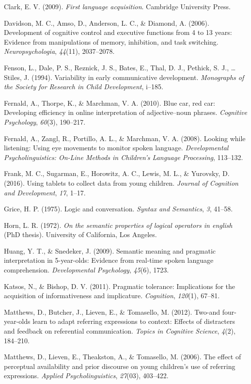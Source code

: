 \documentclass[a4paper,man,apacite,floatsintext]{apa6}
\begin{document}
Clark, E. V. (2009). \emph{First language acquisition}. Cambridge
University Press.

Davidson, M. C., Amso, D., Anderson, L. C., \& Diamond, A. (2006).
Development of cognitive control and executive functions from 4 to 13
years: Evidence from manipulations of memory, inhibition, and task
switching. \emph{Neuropsychologia}, \emph{44}(11), 2037--2078.

Fenson, L., Dale, P. S., Reznick, J. S., Bates, E., Thal, D. J.,
Pethick, S. J., \ldots{} Stiles, J. (1994). Variability in early
communicative development. \emph{Monographs of the Society for Research
in Child Development}, i--185.

Fernald, A., Thorpe, K., \& Marchman, V. A. (2010). Blue car, red car:
Developing efficiency in online interpretation of adjective--noun
phrases. \emph{Cognitive Psychology}, \emph{60}(3), 190--217.

Fernald, A., Zangl, R., Portillo, A. L., \& Marchman, V. A. (2008).
Looking while listening: Using eye movements to monitor spoken language.
\emph{Developmental Psycholinguistics: On-Line Methods in Children's
Language Processing}, 113--132.

Frank, M. C., Sugarman, E., Horowitz, A. C., Lewis, M. L., \& Yurovsky,
D. (2016). Using tablets to collect data from young children.
\emph{Journal of Cognition and Development}, \emph{17}, 1--17.

Grice, H. P. (1975). Logic and conversation. \emph{Syntax and
Semantics}, \emph{3}, 41--58.

Horn, L. R. (1972). \emph{On the semantic properties of logical
operators in english} (PhD thesis). University of California, Los
Angeles.

Huang, Y. T., \& Snedeker, J. (2009). Semantic meaning and pragmatic
interpretation in 5-year-olds: Evidence from real-time spoken language
comprehension. \emph{Developmental Psychology}, \emph{45}(6), 1723.

Katsos, N., \& Bishop, D. V. (2011). Pragmatic tolerance: Implications
for the acquisition of informativeness and implicature.
\emph{Cognition}, \emph{120}(1), 67--81.

Matthews, D., Butcher, J., Lieven, E., \& Tomasello, M. (2012). Two-and
four-year-olds learn to adapt referring expressions to context: Effects
of distracters and feedback on referential communication. \emph{Topics
in Cognitive Science}, \emph{4}(2), 184--210.

Matthews, D., Lieven, E., Theakston, A., \& Tomasello, M. (2006). The
effect of perceptual availability and prior discourse on young
children's use of referring expressions. \emph{Applied
Psycholinguistics}, \emph{27}(03), 403--422.
\end{document}
